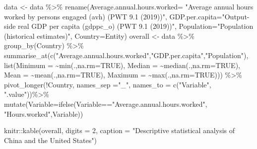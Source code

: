\documentclass[11pt,a4paper,]{article}
\newenvironment{Shaded}{\begin{snugshade}}{\end{snugshade}}
\newcommand{\AttributeTok}[1]{\textcolor[rgb]{0.77,0.63,0.00}{#1}}
\newcommand{\ConstantTok}[1]{\textcolor[rgb]{0.00,0.00,0.00}{#1}}
\newcommand{\DecValTok}[1]{\textcolor[rgb]{0.00,0.00,0.81}{#1}}
\newcommand{\FunctionTok}[1]{\textcolor[rgb]{0.00,0.00,0.00}{#1}}
\newcommand{\NormalTok}[1]{#1}
\newcommand{\OtherTok}[1]{\textcolor[rgb]{0.56,0.35,0.01}{#1}}
\newcommand{\SpecialCharTok}[1]{\textcolor[rgb]{0.00,0.00,0.00}{#1}}
\newcommand{\StringTok}[1]{\textcolor[rgb]{0.31,0.60,0.02}{#1}}
\begin{document}
\begin{Shaded}
\begin{Highlighting}[]
\NormalTok{data }\OtherTok{\textless{}{-}}\NormalTok{ data }\SpecialCharTok{\%\textgreater{}\%}
  \FunctionTok{rename}\NormalTok{(}\AttributeTok{Average.annual.hours.worked=}
        \StringTok{"Average annual hours worked by persons engaged (avh) (PWT 9.1 (2019))"}\NormalTok{,}
        \AttributeTok{GDP.per.capita=}\StringTok{"Output{-}side real GDP per capita (gdppc\_o) (PWT 9.1 (2019))"}\NormalTok{,}
        \AttributeTok{Population=}\StringTok{"Population (historical estimates)"}\NormalTok{,}
        \AttributeTok{Country=}\NormalTok{Entity) }
\NormalTok{ overall }\OtherTok{\textless{}{-}}\NormalTok{ data }\SpecialCharTok{\%\textgreater{}\%}
    \FunctionTok{group\_by}\NormalTok{(Country) }\SpecialCharTok{\%\textgreater{}\%}
    \FunctionTok{summarise\_at}\NormalTok{(}\FunctionTok{c}\NormalTok{(}\StringTok{"Average.annual.hours.worked"}\NormalTok{,}\StringTok{"GDP.per.capita"}\NormalTok{,}\StringTok{"Population"}\NormalTok{),}
                 \FunctionTok{list}\NormalTok{(}\AttributeTok{Minimum =} \SpecialCharTok{\textasciitilde{}}\FunctionTok{min}\NormalTok{(.,}\AttributeTok{na.rm=}\ConstantTok{TRUE}\NormalTok{), }
                      \AttributeTok{Median =} \SpecialCharTok{\textasciitilde{}}\FunctionTok{median}\NormalTok{(.,}\AttributeTok{na.rm=}\ConstantTok{TRUE}\NormalTok{), }
                      \AttributeTok{Mean =} \SpecialCharTok{\textasciitilde{}}\FunctionTok{mean}\NormalTok{(.,}\AttributeTok{na.rm=}\ConstantTok{TRUE}\NormalTok{),}
                      \AttributeTok{Maximum =} \SpecialCharTok{\textasciitilde{}}\FunctionTok{max}\NormalTok{(.,}\AttributeTok{na.rm=}\ConstantTok{TRUE}\NormalTok{))) }\SpecialCharTok{\%\textgreater{}\%}
    \FunctionTok{pivot\_longer}\NormalTok{(}\SpecialCharTok{!}\NormalTok{Country, }\AttributeTok{names\_sep =}\StringTok{"\_"}\NormalTok{,}
                 \AttributeTok{names\_to =} \FunctionTok{c}\NormalTok{(}\StringTok{"Variable"}\NormalTok{, }\StringTok{".value"}\NormalTok{))}\SpecialCharTok{\%\textgreater{}\%}
   \FunctionTok{mutate}\NormalTok{(}\AttributeTok{Variable=}\FunctionTok{ifelse}\NormalTok{(Variable}\SpecialCharTok{==}\StringTok{"Average.annual.hours.worked"}\NormalTok{,}
                          \StringTok{"Hours.worked"}\NormalTok{,Variable))}
\end{Highlighting}
\end{Shaded}

\begin{Shaded}
\begin{Highlighting}[]
\NormalTok{knitr}\SpecialCharTok{::}\FunctionTok{kable}\NormalTok{(overall, }\AttributeTok{digits =} \DecValTok{2}\NormalTok{,}
    \AttributeTok{caption =} \StringTok{"Descriptive statistical analysis of China and the United States"}\NormalTok{)}
\end{Highlighting}
\end{Shaded}
\end{document}
